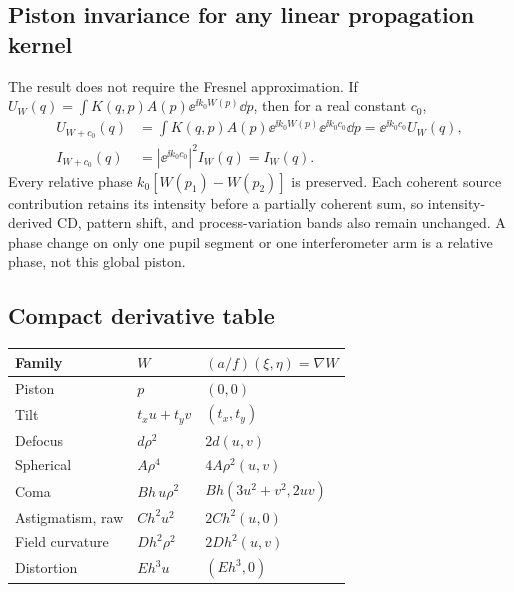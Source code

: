 \subsection{Piston invariance for any linear propagation kernel}
The result does not require the Fresnel approximation. If
$U_W(q)=\int K(q,p)A(p)\ee^{\ii k_0W(p)}\dd p$, then for a real constant $c_0$,
\begin{align}
U_{W+c_0}(q)&=\int K(q,p)A(p)\ee^{\ii k_0W(p)}\ee^{\ii k_0c_0}\dd p
=\ee^{\ii k_0c_0}U_W(q),\\
I_{W+c_0}(q)&=|\ee^{\ii k_0c_0}|^2I_W(q)=I_W(q).
\end{align}
Every relative phase $k_0[W(p_1)-W(p_2)]$ is preserved. Each coherent source contribution retains its intensity before a partially coherent sum, so intensity-derived CD, pattern shift, and process-variation bands also remain unchanged. A phase change on only one pupil segment or one interferometer arm is a relative phase, not this global piston.

\subsection{Compact derivative table}
\begin{center}\small
\begin{tabularx}{\textwidth}{@{}l l Y@{}}\toprule
Family & $W$ & $(a/f)(\xi,\eta)=\nabla W$\\\midrule
Piston & $p$ & $(0,0)$\\
Tilt & $t_xu+t_yv$ & $(t_x,t_y)$\\
Defocus & $d\rho^2$ & $2d(u,v)$\\
Spherical & $A\rho^4$ & $4A\rho^2(u,v)$\\
Coma & $Bh\,u\rho^2$ & $Bh(3u^2+v^2,2uv)$\\
Astigmatism, raw & $Ch^2u^2$ & $2Ch^2(u,0)$\\
Field curvature & $Dh^2\rho^2$ & $2Dh^2(u,v)$\\
Distortion & $Eh^3u$ & $(Eh^3,0)$\\\bottomrule
\end{tabularx}\end{center}


